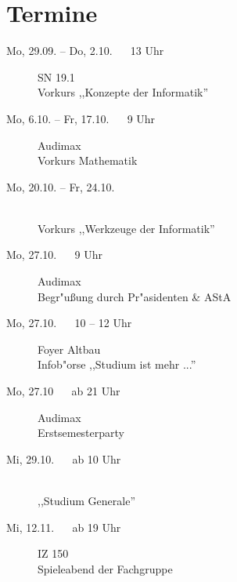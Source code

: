 \section{Termine}

\begin{description}
  \item[Mo, 29.09. -- Do, 2.10. ~~ 13 Uhr] \hfill SN 19.1 \\
  Vorkurs ,,Konzepte der Informatik''
  \item[Mo, 6.10. -- Fr, 17.10. ~~ 9 Uhr] \hfill Audimax \\
  Vorkurs Mathematik
  \item[Mo, 20.10. -- Fr, 24.10.] \ \\
  Vorkurs ,,Werkzeuge der Informatik''
  \item[Mo, 27.10. ~~ 9 Uhr] \hfill Audimax \\
  Begr"u\ss ung durch Pr"asidenten \& AStA
  \item[Mo, 27.10. ~~ 10 -- 12 Uhr] \hfill Foyer Altbau \\
  Infob"orse ,,Studium ist mehr ...''
  \item[Mo, 27.10 ~~ ab 21 Uhr] \hfill Audimax \\
  Erstsemesterparty
  \item[Mi, 29.10. ~~ ab 10 Uhr] \ \\
  ,,Studium Generale''
  \item[Mi, 12.11. ~~ ab 19 Uhr] \hfill IZ 150 \\
  Spieleabend der Fachgruppe
\end{description}

